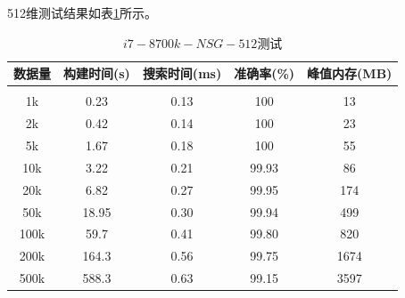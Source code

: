 \documentclass[a4paper, 11pt, UTF8]{ctexart}%
\begin{document}
512维测试结果如表\ref{tab:i7-8700k-NSG-512}所示。
\begin{table}[H]
\caption{$i7-8700k-NSG-512$测试}
\label{tab:i7-8700k-NSG-512}
\begin{center}
\begin{tabular}{ccccc}
\multicolumn{1}{c}{\bf 数据量}  &\multicolumn{1}{c}{\bf 构建时间(s)}  &\multicolumn{1}{c}{\bf 搜索时间(ms)}  &\multicolumn{1}{c}{\bf 准确率(\%)}  &\multicolumn{1}{c}{\bf 峰值内存(MB)}
\\ \hline \\
1k & 0.23 & 0.13 & 100 & 13\\
2k & 0.42 & 0.14 & 100 & 23\\
5k & 1.67 & 0.18 & 100 & 55\\
10k & 3.22 & 0.21 & 99.93 & 86\\
20k & 6.82 & 0.27 & 99.95 & 174\\
50k & 18.95 & 0.30 & 99.94 & 499\\
100k & 59.7 & 0.41 & 99.80 & 820\\
200k & 164.3 & 0.56 & 99.75 & 1674\\
500k & 588.3 & 0.63 & 99.15 & 3597\\
\end{tabular}
\end{center}
\end{table}
\end{document}
